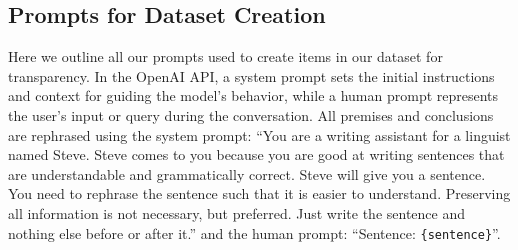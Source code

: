 \begin{appendix}
    \section{Prompts for Dataset Creation}\label{secA:dataset_creation}
        Here we outline all our prompts used to create items in our dataset for transparency. In the OpenAI API, a system prompt sets the initial instructions and context for guiding the model's behavior, while a human prompt represents the user's input or query during the conversation. All premises and conclusions are rephrased using the system prompt: ``You are a writing assistant for a linguist named Steve. Steve comes to you because you are good at writing sentences that are understandable and grammatically correct. Steve will give you a sentence. You need to rephrase the sentence such that it is easier to understand. Preserving all information is not necessary, but preferred. Just write the sentence and nothing else before or after it.'' and the human prompt: ``Sentence: \texttt{\{sentence\}}''.
        

\end{appendix}
